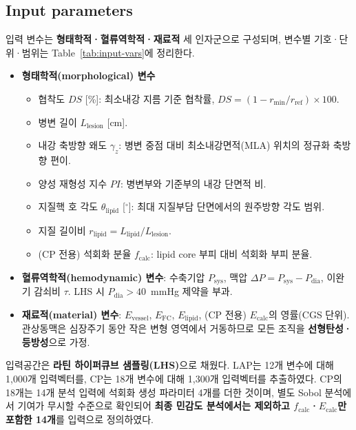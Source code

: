 \documentclass[master,english,final]{kaist-ucs}
\begin{document}

\subsection{Input parameters}

입력 변수는 \textbf{형태학적·혈류역학적·재료적} 세 인자군으로 구성되며, 변수별 기호·단위·범위는 Table~\ref{tab:input-vars}에 정리한다.

\begin{itemize}
\item \textbf{형태학적(morphological) 변수}
\begin{itemize}
\item 협착도 $DS$ [\%]: 최소내강 지름 기준 협착률, $DS=(1-r_\mathrm{min}/r_\mathrm{ref})\times100$.
\item 병변 길이 $L_\mathrm{lesion}$ [cm].
\item 내강 축방향 왜도 $\gamma_z$: 병변 중점 대비 최소내강면적(MLA) 위치의 정규화 축방향 편이.
\item 양성 재형성 지수 $PI$: 병변부와 기준부의 내강 단면적 비.
\item 지질핵 호 각도 $\theta_\mathrm{lipid}$ [$^\circ$]: 최대 지질부담 단면에서의 원주방향 각도 범위.
\item 지질 길이비 $r_\mathrm{lipid}=L_\mathrm{lipid}/L_\mathrm{lesion}$.
\item (CP 전용) 석회화 분율 $f_\mathrm{calc}$: lipid core 부피 대비 석회화 부피 분율.
\end{itemize}
\item \textbf{혈류역학적(hemodynamic) 변수}: 수축기압 $P_\mathrm{sys}$, 맥압 $\Delta P=P_\mathrm{sys}-P_\mathrm{dia}$, 이완기 감쇠비 $\tau$. LHS 시 $P_\mathrm{dia}>40$~mmHg 제약을 부과.
\item \textbf{재료적(material) 변수}: $E_\mathrm{vessel}$, $E_\mathrm{FC}$, $E_\mathrm{lipid}$, (CP 전용) $E_\mathrm{calc}$의 영률(CGS 단위). 관상동맥은 심장주기 동안 작은 변형 영역에서 거동하므로 모든 조직을 \textbf{선형탄성·등방성}으로 가정.
\end{itemize}

입력공간은 \textbf{라틴 하이퍼큐브 샘플링(LHS)}으로 채웠다. LAP는 12개 변수에 대해 1{,}000개 입력벡터를, CP는 18개 변수에 대해 1{,}300개 입력벡터를 추출하였다. CP의 18개는 14개 분석 입력에 석회화 생성 파라미터 4개를 더한 것이며, 별도 Sobol 분석에서 기여가 무시할 수준으로 확인되어 \textbf{최종 민감도 분석에서는 제외하고 $f_\mathrm{calc}$·$E_\mathrm{calc}$만 포함한 14개}를 입력으로 정의하였다.
\end{document}
